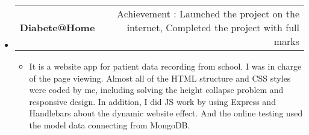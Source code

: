 \documentclass[letterpaper,12pt]{article}[leftmargin=*]
\makeatletter
\def \entryspacing {-0pt}
\newcommand{\resumeEntryStart}{\begin{itemize}[leftmargin=2.5mm]}
\newcommand{\resumeEntryEnd}{\end{itemize}\vspace{\entryspacing}}
\newcommand{\resumeItemListStart}{\begin{itemize}[leftmargin=4.5mm]}
\newcommand{\resumeItemListEnd}{\end{itemize}}
\newcommand{\resumeItem}[1]{
  \item\small{
    {#1 \vspace{-2pt}}
  }
}
\newcommand{\resumeEntryTD}[2]{
  \vspace{-1pt}\item[]
    \begin{tabularx}{0.97\textwidth}{X@{\hspace{60pt}}r}
      \textbf{\color{primary}#1} & {\firabook\color{accent}\small#2} \\
    \end{tabularx}\vspace{-6pt}
}
\makeatother
\begin{document}
  \resumeEntryStart
    \resumeEntryTD
      {Diabete@Home}
      
      
      {Achievement : Launched the project on the internet, Completed the project with full marks}
    \resumeItemListStart
      \resumeItem {It is a website app for patient data recording from school. I was in charge of the page viewing. Almost all of the HTML structure and CSS styles were coded by me, including solving the height collapse problem and responsive design. In addition, I did JS work by using Express and Handlebars about the dynamic website effect. And the online testing used the model data connecting from MongoDB.}
    \resumeItemListEnd
  \resumeEntryEnd
\end{document}
